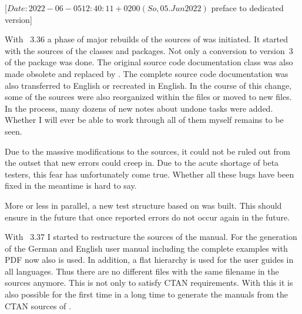 %
%
%
%
%

                 [$Date: 2022-06-05 12:40:11 +0200 (So, 05. Jun 2022) $
                  preface to dedicated version]


With \KOMAScript~3.36 a phase of major rebuilds of the sources of
\KOMAScript{} was initiated. It started with the sources of the classes and
packages. Not only a conversion to version~3 of the package  was
done. The original source code documentation class  was also
made obsolete and replaced by . The complete
source code documentation was also transferred to English or recreated in
English. In the course of this change, some of the sources were also
reorganized within the files or moved to new files. In the process, many
dozens of new notes about undone tasks were added. Whether I will ever be able
to work through all of them myself remains to be seen.

Due to the massive modifications to the sources, it could not be ruled out
from the outset that new errors could creep in. Due to the acute shortage of
beta testers, this fear has unfortunately come true. Whether all these bugs
have been fixed in the meantime is hard to say.

More or less in parallel, a new test structure based on  was
built. This should ensure in the future that once reported errors do not occur
again in the future.

With \KOMAScript~3.37 I started to restructure the sources of the manual. For
the generation of the German and English user manual including the complete
examples with PDF now also  is used. In addition, a flat
hierarchy is used for the user guides in all languages. Thus there are no
different files with the same filename in the sources anymore. This is not
only to satisfy CTAN requirements. With this it is also possible for the first
time in a long time to generate the manuals from the CTAN sources of
\KOMAScript.

